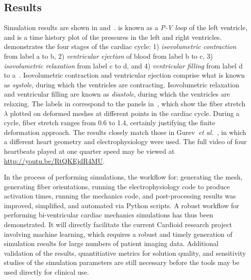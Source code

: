 \subsection{Results}
\label{Results}

Simulation results are shown in  and~.  is known as a \textit{P-V loop} of the left ventricle, and  is a time history plot of the pressures in the left and right ventricles.  demonstrates the four stages of the cardiac cycle: 1) \textit{isovolumetric contraction} from label a to b, 2) \textit{ventricular ejection} of blood from label b to c, 3) \textit{isovolumetric relaxation} from label c to d, and 4) \textit{ventricular filling} from label d to a~\cite{slideshare}. Isovolumetric contraction and ventricular ejection comprise what is known as \textit{systole}, during which the ventricles are contracting. Isovolumetric relaxation and ventricular filling are known as \textit{diastole}, during which the ventricles are relaxing. The labels in  correspond to the panels in~, which show the fiber stretch $\lambda$ plotted on deformed meshes at different points in the cardiac cycle. During a cycle, fiber stretch ranges from 0.6 to 1.4, certainly justifying the finite deformation approach. The results closely match those in Gurev~\textit{et al.}~\cite{gurev_2015}, in which a different heart geometry and electrophysiology were used. The full video of four heartbeats played at one quarter speed may be viewed at \href{http://youtu.be/RtQKEjdR4MU}{{\url{http://youtu.be/RtQKEjdR4MU}}}.

In the process of performing simulations, the workflow for: generating the mesh, generating fiber orientations, running the electrophysiology code to produce activation times, running the mechanics code, and post-processing results was improved, simplified, and automated via Python scripts. A robust workflow for performing bi-ventricular cardiac mechanics simulations has thus been demonstrated. It will directly facilitate the current Cardioid research project involving machine learning, which requires a robust and timely generation of simulation results for large numbers of patient imaging data. Additional validation of the results, quantitiative metrics for solution quality, and sensitivity studies of the simulation parameters are still necessary before the tools may be used directly for clinical use.

